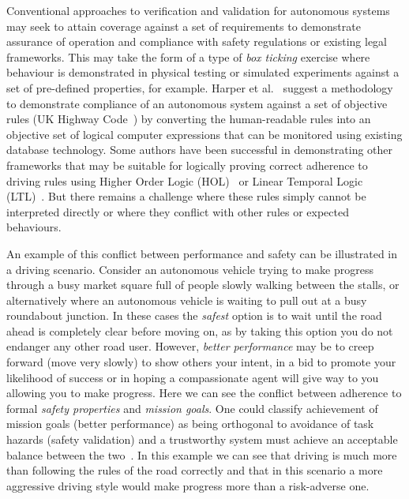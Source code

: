 \documentclass[sigconf]{acmart}
\begin{document}
Conventional approaches to verification and validation for autonomous systems may seek to attain coverage against a set of requirements to demonstrate assurance of operation and compliance with safety regulations or existing legal frameworks. 
%
This may take the form of a type of \emph{box ticking} exercise where behaviour is demonstrated in physical testing or simulated experiments against a set of pre-defined properties, for example. 
%
Harper et al.~\cite{harper2021safety} suggest a methodology to demonstrate compliance of an autonomous system against a set of objective rules (UK Highway Code~\cite{highwayCode}) by converting the human-readable rules into an objective set of logical computer expressions that can be monitored using existing database technology. 
%
Some authors have been successful in demonstrating other frameworks that may be suitable for logically proving correct adherence to driving rules using Higher Order Logic (HOL)~\cite{rizaldi} or Linear Temporal Logic (LTL)~\cite{esterle2020}. 
%
But there remains a challenge where these rules simply cannot be interpreted directly or where they conflict with other rules or expected behaviours. 

An example of this conflict between performance and safety can be illustrated in a driving scenario. Consider an autonomous vehicle trying to make progress through a busy market square full of people slowly walking between the stalls, or alternatively where an autonomous vehicle is waiting to pull out at a busy roundabout junction. 
%
In these cases the \emph{safest} option is to wait until the road ahead is completely clear before moving on, as by taking this option you do not endanger any other road user. However, \emph{better performance} may be to creep forward (move very slowly) to show others your intent, in a bid to promote your likelihood of success or in hoping a compassionate agent will give way to you allowing you to make progress. 
%
Here we can see the conflict between adherence to formal \emph{safety properties} and \emph{mission goals}. 
%
One could classify achievement of mission goals (better performance) as being orthogonal to avoidance of task hazards (safety validation) and a trustworthy system must achieve an acceptable balance between the two~\cite{harper2021safety}.
%
In this example we can see that driving is much more than following the rules of the road correctly and that in this scenario a more aggressive driving style would make progress more than a risk-adverse one. 
\end{document}
